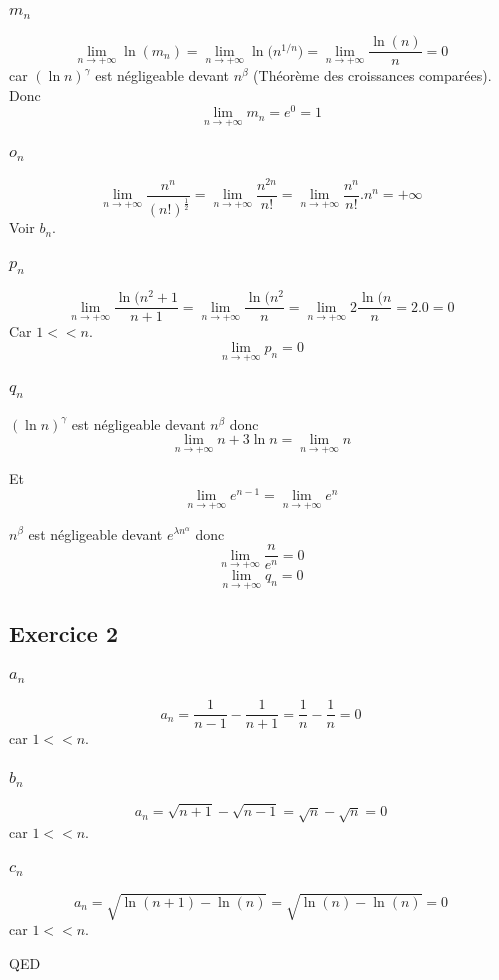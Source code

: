 \documentclass[]{book}
\theoremstyle{definition}
\begin{document}
\subsubsection*{$m_n$}
$$\lim_{n \to +\infty}{\ln(m_n)} = \lim_{n \to +\infty}{\ln(n^{1/n}}) = \lim_{n \to +\infty}{\frac{\ln(n)}{n}} = 0$$
car $(\ln n)^{\gamma}$ est n\'egligeable devant $n^{\beta}$ (Th\'eor\`eme des croissances compar\'ees). Donc
$$\lim_{n \to +\infty}{m_n} = e^0 = 1$$
 

\subsubsection*{$o_n$}
$$\lim_{n \to +\infty}{\frac{n^n}{(n!)^{\frac{1}{2}}}} = \lim_{n \to +\infty}{\frac{n^{2n}}{n!}} = \lim_{n \to +\infty}{\frac{n^n}{n!}.n^n} = +\infty$$
Voir $b_n$.

\subsubsection*{$p_n$}
$$\lim_{n \to +\infty}{\frac{\ln(n^2+1}{n+1}} = \lim_{n \to +\infty}{\frac{\ln(n^2}{n}} = \lim_{n \to +\infty}{2\frac{\ln(n}{n}} = 2.0 = 0$$
Car $1 << n$.
$$\lim_{n \to +\infty}{p_n} = 0$$

\subsubsection*{$q_n$}
$(\ln n)^{\gamma}$ est n\'egligeable devant $n^{\beta}$ donc
$$\lim_{n \to +\infty}{n + 3\ln n} = \lim_{n \to +\infty}{n}$$

Et
$$\lim_{n \to +\infty}{e^{n-1}} = \lim_{n \to +\infty}{e^{n}}$$

$n^{\beta}$ est n\'egligeable devant $e^{\lambda n^{\alpha}}$ donc
$$\lim_{n \to +\infty}{\frac{n}{e^{n}}} = 0$$
$$\lim_{n \to +\infty}{q_n} = 0$$


\subsection*{Exercice 2}
\subsubsection*{$a_n$}
$$a_n = \frac{1}{n-1}-\frac{1}{n+1} = \frac{1}{n}-\frac{1}{n} = 0$$
car $1 << n$.

\subsubsection*{$b_n$}
$$a_n = \sqrt{n+1}-\sqrt{n-1} = \sqrt{n}-\sqrt{n} = 0$$
car $1 << n$.

\subsubsection*{$c_n$}
$$a_n = \sqrt{\ln(n+1)-\ln(n)} = \sqrt{\ln(n)-\ln(n)} = 0$$
car $1 << n$.



QED
\end{document}
